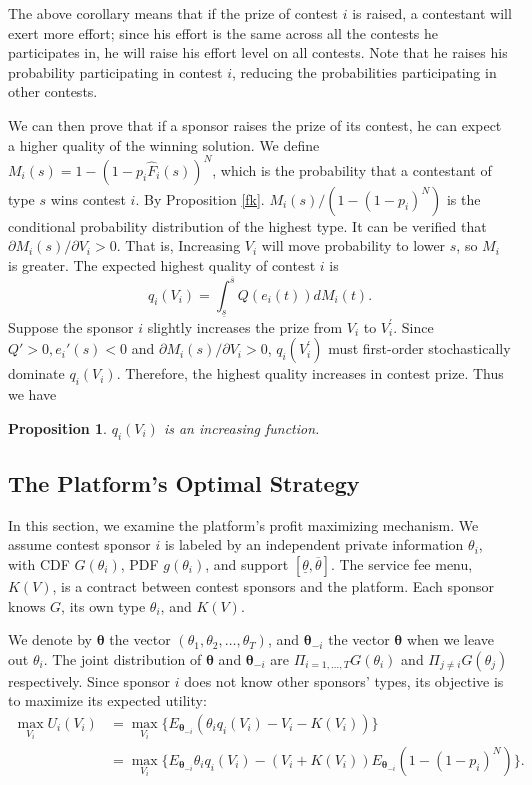 \documentclass[12pt]{article}
\newtheorem{Proposition}{Proposition}
\begin{document}
The above corollary means that if the prize of contest $i$ is raised, a contestant will exert more effort; since his effort is the same across all the contests he participates in, he will raise his effort level on all contests. Note that he raises his probability participating in contest $i$, reducing the
probabilities participating in other contests.

We can then prove that if a sponsor raises the prize of its contest, he can expect a higher quality of the winning solution.
We define $M_{i}(s)=1-(1-p_{i}\hat{F}_{i}(s))^{N}$, which is the probability that a contestant of type $s$ wins contest $i$. By Proposition \ref{fk}.
$M_{i}(s)/(1-(1-p_{i})^{N})$ is the conditional probability distribution
of the highest type. It can be verified that $\partial M_{i}(s)/\partial V_{i}>0$.
That is, Increasing $V_{i}$ will move probability to lower $s$,
so $M_{i}$ is greater. The expected highest quality of contest $i$
is
\begin{equation}
q_{i}(V_{i})=\int_{\underline{s}}^{\overline{s}}Q(e_{i}(t))dM_{i}(t).
\end{equation}
Suppose the sponsor $i$ slightly increases the prize from $V_{i}$
to $V_{i}^{'}$. Since $Q'>0,e_{i}'(s)<0$ and $\partial M_{i}(s)/\partial V_{i}>0$,
$q_{i}(V_{i}^{'})$ must first-order stochastically dominate $q_{i}(V_{i})$.
Therefore, the highest quality increases in contest prize. Thus we have

\begin{Proposition} $q_{i}(V_{i})$ is an increasing function. \end{Proposition}


\subsection{The Platform's Optimal Strategy}
In this section, we examine the platform's profit maximizing mechanism. We assume contest sponsor $i$ is labeled by an independent
private information $\theta_{i}$, with CDF $G(\theta_{i})$, PDF $g(\theta_{i})$,
and support $[\underline{\theta},\overline{\theta}]$. The service
fee menu, $K(V)$, is a contract between contest sponsors and the platform. Each sponsor knows $G$, its own type  $\theta_{i}$, and $K(V)$.

We denote by $\boldsymbol{\theta}$ the vector $(\theta_{1},\theta_{2},\dots,\theta_{T})$,
and $\boldsymbol{\theta}_{-i}$ the vector $\boldsymbol{\theta}$
when we leave out $\theta_{i}$. The joint distribution of $\boldsymbol{\theta}$
and $\boldsymbol{\theta}_{-i}$ are $\Pi_{i=1,\dots,T}G(\theta_{i})$
and $\Pi_{j\neq i}G(\theta_{j})$ respectively. Since sponsor $i$
does not know other sponsors' types, its objective is to maximize
its expected utility:
\begin{align}
\max_{V_{i}}U_{i}(V_{i}) & =\max_{V_{i}}\{E_{\boldsymbol{\theta}_{-i}}(\theta_{i}q_{i}(V_{i})-V_{i}-K(V_{i}))\}\\
 & =\max_{V_{i}}\{E_{\boldsymbol{\theta}_{-i}}\theta_{i}q_{i}(V_{i})-(V_{i}+K(V_{i}))E_{\boldsymbol{\theta}_{-i}}(1-(1-p_{i})^{N})\}.\label{UContest}
\end{align}
\end{document}
